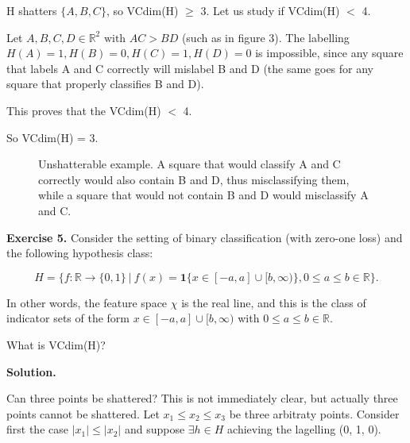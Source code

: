 \documentclass{article}
\newcommand{\<}{\langle}
\renewcommand{\>}{\rangle}
\theoremstyle{definition}
\begin{document}
H shatters $\{A, B, C\}$, so VCdim(H) $\geq$ 3. Let us study if VCdim(H) $<$ 4.


Let $A,B,C,D \in \mathbb{R}^2 \text{ with } AC > BD$ (such as in figure 3). The labelling $H(A) = 1, H(B) = 0, H(C) = 1, H(D) = 0$ is impossible, since any square that labels A and C correctly will mislabel B and D (the same goes for any square that properly classifies B and D). 

This proves that the VCdim(H) $<$ 4.

So VCdim(H) = 3.

\begin{figure}[hbt!]
\centering
{}
\caption{Unshatterable example. A square that would classify A and C correctly would also contain B and D, thus misclassifying them, while a square that would not contain B and D would misclassify A and C.}
\label{fig:my_label}
\end{figure}

\textbf{Exercise 5.} Consider the setting of binary classification (with zero-one loss) and the following hypothesis class:

$$H = \{f : \mathbb{R} \rightarrow \{0,1\} \ | \ f(x) = \textbf{1}\{x \in [-a, a] \cup [b, \infty)\}, 0 \leq a \leq b \in \mathbb{R} \}.$$

In other words, the feature space $\chi$ is the real line, and this is the class of indicator sets of the form $x \in [-a, a] \cup [b, \infty)$ with $0 \leq a \leq b \in \mathbb{R}$. 

What is VCdim(H)?

\textbf{Solution.}

Can three points be shattered? This is not immediately clear, but actually three points cannot be shattered. Let $x_1 \leq x_2 \leq x_3$ be three arbitraty points. Consider first the case $|x_1| \leq |x_2|$ and suppose $\exists h \in H$ achieving the lagelling (0, 1, 0). 
\end{document}
